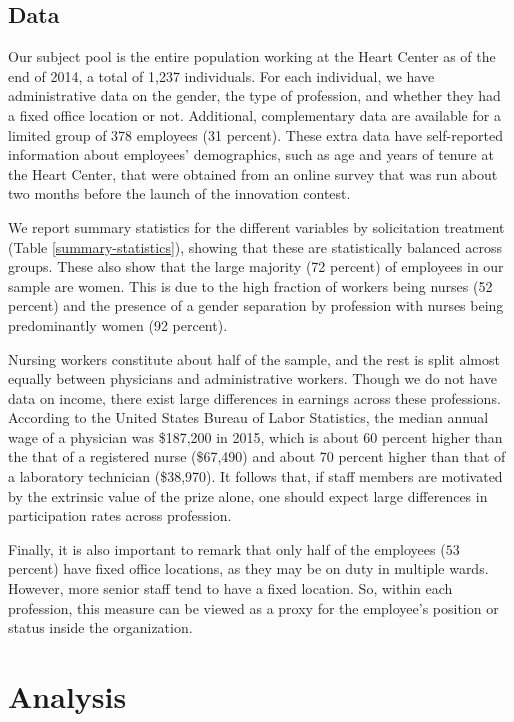 \documentclass[11pt, titlepage]{article}
\begin{document}
\subsection{Data}\label{data}

Our subject pool is the entire population working at the Heart Center as
of the end of 2014, a total of 1,237 individuals. For each individual,
we have administrative data on the gender, the type of profession, and
whether they had a fixed office location or not. Additional,
complementary data are available for a limited group of 378 employees
(31 percent). These extra data have self-reported information about
employees' demographics, such as age and years of tenure at the Heart
Center, that were obtained from an online survey that was run about two
months before the launch of the innovation contest.

We report summary statistics for the different variables by solicitation
treatment (Table \ref{summary-statistics}), showing that these are
statistically balanced across groups. These also show that the large
majority (72 percent) of employees in our sample are women. This is due
to the high fraction of workers being nurses (52 percent) and the
presence of a gender separation by profession with nurses being
predominantly women (92 percent).

Nursing workers constitute about half of the sample, and the rest is
split almost equally between physicians and administrative workers.
Though we do not have data on income, there exist large differences in
earnings across these professions. According to the United States Bureau
of Labor Statistics, the median annual wage of a physician was \$187,200
in 2015, which is about 60 percent higher than the that of a registered
nurse (\$67,490) and about 70 percent higher than that of a laboratory
technician (\$38,970). It follows that, if staff members are motivated
by the extrinsic value of the prize alone, one should expect large
differences in participation rates across profession.

Finally, it is also important to remark that only half of the employees
(\(53\) percent) have fixed office locations, as they may be on duty in
multiple wards. However, more senior staff tend to have a fixed
location. So, within each profession, this measure can be viewed as a
proxy for the employee's position or status inside the organization.



\section{Analysis}\label{analysis}
\end{document}
